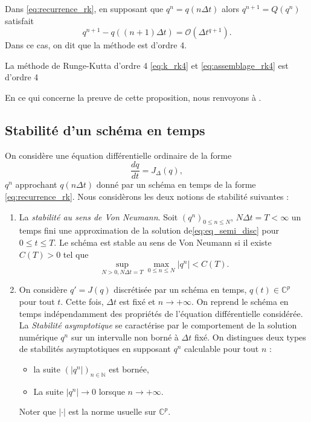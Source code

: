 Dans \eqref{eq:recurrence_rk}, en supposant que $q^n = q(n \Delta t)$ alors $q^{n+1}=Q(q^n)$ satisfait 
\begin{equation}
q^{n+1} - q((n+1) \Delta t) = \mathcal{O}(\Delta t^{q+1}).
\end{equation}
Dans ce cas, on dit que la méthode est d'ordre 4.

\begin{proposition}
La méthode de Runge-Kutta d'ordre 4 \eqref{eq:k_rk4} et \eqref{eq:assemblage_rk4} est d'ordre 4
\end{proposition}
En ce qui concerne la preuve de cette proposition, nous renvoyons à \cite{Demailly2016}.


\subsection{Stabilité d'un schéma en temps}

On considère une équation différentielle ordinaire de la forme
\begin{equation}
\dfrac{dq}{dt} = J_{\Delta}(q),
\label{eq:eq_semi_disc}
\end{equation}
$q^n$ approchant $q(n \Delta t)$ donné par un schéma en temps de la forme \eqref{eq:recurrence_rk}. Nous considèrons les deux notions de stabilité suivantes :
\begin{enumerate}
\item La \textit{stabilité au sens de Von Neumann}. Soit $(q^n)_{0 \leq n \leq N}$, $N \Delta t = T < \infty$ un temps fini une approximation de la solution de\eqref{eq:eq_semi_disc} pour $0 \leq t \leq T$. Le schéma est stable au sens de Von Neumann si il existe $C(T)>0$ tel que
\begin{equation}
\sup_{N>0, N \Delta t = T} \max_{0 \leq n \leq N} |q^n| < C(T).
\end{equation}

\item On considère $q'=J(q)$ discrétisée par un schéma en temps, $q(t) \in \mathbb{C}^p$ pour tout $t$. Cette fois, $\Delta t$ est fixé et $n \rightarrow + \infty$. On reprend le schéma en temps indépendamment des propriétés de l'équation différentielle considérée. La \textit{Stabilité asymptotique} se caractérise par le comportement de la solution numérique $q^n$ sur un intervalle non borné à $\Delta t$ fixé. On distingues deux types de stabilités asymptotiques en supposant $q^n$ calculable pour tout $n$ :
\begin{itemize}
\item la suite $(|q^n|)_{n \in \mathbb{N}}$ est bornée,
\item La suite $|q^n| \rightarrow 0$ lorsque $n \rightarrow + \infty$.
\end{itemize}
Noter que $|\cdot|$ est la norme usuelle sur $\mathbb{C}^p$.
\end{enumerate} 

